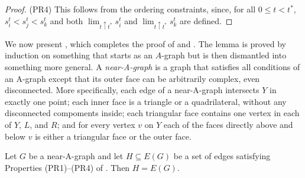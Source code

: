\begin{proof}
		
(PR4) This follows from the ordering
constraints, since, for all $0\le t< t^*$,
		$s_i^t<s_j^t<s_k^t$ and both $\lim_{t\uparrow
		t^*}s_i^t$ and $\lim_{t\uparrow t^*}s_k^t$ are defined.
	\end{proof}
	
We now present , which completes the proof of  and . The lemma is proved by induction on something
that starts as an $A$-graph but is then dismantled into something
more general.  A \emph{near-A-graph} is a graph that satisfies all
conditions of an A-graph except that its outer face can be arbitrarily
complex, even disconnected.  More specifically, each edge of a near-A-graph intersects $Y$
in exactly one point; each inner face is a triangle or a quadrilateral,
without any disconnected compoments inside;
each triangular face contains one vertex in each of $Y$, $L$, and $R$;
and for every vertex $v$ on $Y$ each of the faces directly above and
below $v$ is either a triangular face or the outer face.

\begin{lem}
Let $G$ be a near-A-graph and let $H \subseteq E(G)$ be a set of edges satisfying Properties (PR1)--(PR4) of . 
	Then $H=E(G)$.
\end{lem}

